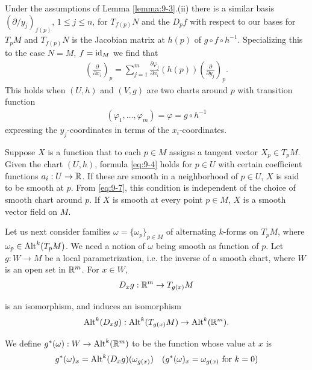 \begin{remark}
Under the assumptions of Lemma \ref{lemma:9-3}.(ii) there is a similar basis 
$(\partial/y_j)_{f(p)}$, $1\le j\le n$, for $T_{f(p)}N$ and the $D_pf$ with 
respect to our bases for $T_pM$ and $T_{f(p)}N$ is the Jacobian matrix at $h(p)$ of $g\circ f\circ h^{-1}$.
Specializing this to the case $N=M$, $f=\operatorname{id}_M$ we find that 
\begin{align}\label{eq:9-7}
  \left(\frac{\partial }{\partial x_i}\right)_p 
  = \sum_{j=1}^{m }{\frac{\partial \varphi_j }{\partial x_i } (h(p))\left(\frac{\partial }{\partial y_j}\right)_p}.
\end{align}
This holds when $(U, h)$ and $(V, g)$ are two charts around $p$ with transition function
\begin{align*}
  (\varphi_1, \ldots, \varphi_m)
  = \varphi
  = g\circ h^{-1}
\end{align*}
expressing the $y_j$-coordinates in terms of the $x_i$-coordinates.
\end{remark}

Suppose $X$ is a function that to each $p\in M$ assigns a tangent vector $X_p\in T_pM$.
Given the chart $(U, h)$, formula \eqref{eq:9-4} holds for $p\in U$ with certain coefficient
functions $a_i: U\to {\ensuremath{\mathbb{R}}}$. If these are smooth in a neighborhood of $p\in U$, $X$ is
said to be smooth at $p$. From \eqref{eq:9-7}, this condition is independent of the choice of
smooth chart around $p$. If $X$ is smooth at every point $p\in M$, $X$ is a smooth
vector field on $M$.

Let us next consider families $\omega=\{\omega_p\}_{p\in M}$ of alternating $k$-forms on $T_pM$, 
where $\omega_p\in \operatorname{Alt}^k(T_pM)$. We need a notion of $\omega$ being smooth as function of $p$. Let
$g:W\to M$ be a local parametrization, i.e. the inverse of a smooth chart, where
$W$ is an open set in ${\mathbb{R}}^m$. For $x\in W$,
\begin{align*}
  D_xg:{\mathbb{R}}^m\to T_{g(x)}M
\end{align*}

is an isomorphism, and induces an isomorphism 
\begin{align*}
  \operatorname{Alt}^k(D_xg):\operatorname{Alt}^k(T_{g(x)}M)\to\operatorname{Alt}^k({\mathbb{R}}^m).
\end{align*}

We define $g^*(\omega):W\to \operatorname{Alt}^k({\mathbb{R}}^m)$ to be the function whose value at $x$ is 
\begin{align*}
  g^*(\omega)_x = \operatorname{Alt}^k(D_xg)(\omega_{g(x)})
  && 
  (g^*(\omega)_x = \omega_{g(x)} \text{ for } k = 0)
\end{align*}

